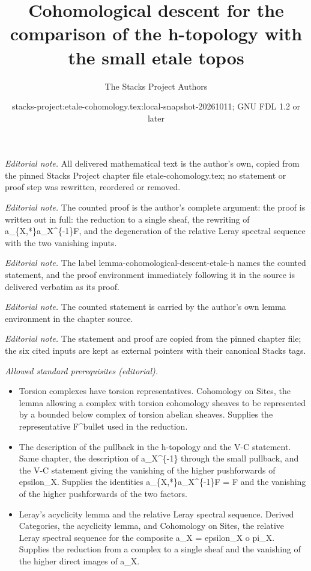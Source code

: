 \documentclass[10pt,a4paper]{amsart}
\title{Cohomological descent for the comparison of the h-topology with the small etale topos}
\author{The Stacks Project Authors}
\date{stacks-project:etale-cohomology.tex:local-snapshot-20261011; GNU FDL 1.2 or later}
\theoremstyle{plain}
\theoremstyle{definition}
\theoremstyle{remark}
\numberwithin{equation}{subsection}
\begin{document}
\maketitle
\noindent\textit{Editorial note.} All delivered mathematical text is the author's own, copied from the pinned Stacks Project chapter file etale-cohomology.tex; no statement or proof step was rewritten, reordered or removed.\par\medskip
\noindent\textit{Editorial note.} The counted proof is the author's complete argument: the proof is written out in full: the reduction to a single sheaf, the rewriting of a\_\{X,*\}a\_X\textasciicircum{}\{-1\}F, and the degeneration of the relative Leray spectral sequence with the two vanishing inputs.\par\medskip
\noindent\textit{Editorial note.} The label lemma-cohomological-descent-etale-h names the counted statement, and the proof environment immediately following it in the source is delivered verbatim as its proof.\par\medskip
\noindent\textit{Editorial note.} The counted statement is carried by the author's own lemma environment in the chapter source.\par\medskip
\noindent\textit{Editorial note.} The statement and proof are copied from the pinned chapter file; the six cited inputs are kept as external pointers with their canonical Stacks tags.\par\medskip
\noindent\textit{Allowed standard prerequisites (editorial).}\begin{itemize}
\item Torsion complexes have torsion representatives. Cohomology on Sites, the lemma allowing a complex with torsion cohomology sheaves to be represented by a bounded below complex of torsion abelian sheaves. Supplies the representative F\textasciicircum{}bullet used in the reduction.
\item The description of the pullback in the h-topology and the V-C statement. Same chapter, the description of a\_X\textasciicircum{}\{-1\} through the small pullback, and the V-C statement giving the vanishing of the higher pushforwards of epsilon\_X. Supplies the identities a\_\{X,*\}a\_X\textasciicircum{}\{-1\}F = F and the vanishing of the higher pushforwards of the two factors.
\item Leray's acyclicity lemma and the relative Leray spectral sequence. Derived Categories, the acyclicity lemma, and Cohomology on Sites, the relative Leray spectral sequence for the composite a\_X = epsilon\_X o pi\_X. Supplies the reduction from a complex to a single sheaf and the vanishing of the higher direct images of a\_X.
\end{itemize}\medskip
\end{document}
